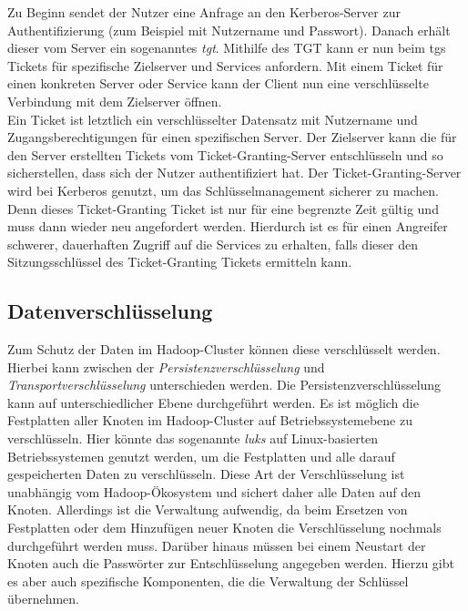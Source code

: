 \noindent
Zu Beginn sendet der Nutzer eine Anfrage an den Kerberos-Server zur Authentifizierung (zum Beispiel mit Nutzername und Passwort). Danach erhält dieser vom Server ein sogenanntes \textit{\gls{tgt}}. Mithilfe des TGT kann er nun beim \gls{tgs} Tickets für spezifische Zielserver und Services anfordern. Mit einem Ticket für einen konkreten Server oder Service kann der Client nun eine verschlüsselte Verbindung mit dem Zielserver öffnen.\\
Ein Ticket ist letztlich ein verschlüsselter Datensatz mit Nutzername und Zugangsberechtigungen für einen spezifischen Server. Der Zielserver kann die für den Server erstellten Tickets vom Ticket-Granting-Server entschlüsseln und so sicherstellen, dass sich der Nutzer authentifiziert hat. Der Ticket-Granting-Server wird bei Kerberos genutzt, um das Schlüsselmanagement sicherer zu machen. Denn dieses Ticket-Granting Ticket ist nur für eine begrenzte Zeit gültig und muss dann wieder neu angefordert werden. Hierdurch ist es für einen Angreifer schwerer, dauerhaften Zugriff auf die Services zu erhalten, falls dieser den Sitzungsschlüssel des Ticket-Granting Tickets ermitteln kann.\cite[S. 425-429]{crypto}\\


\subsection{Datenverschlüsselung}
Zum Schutz der Daten im Hadoop-Cluster können diese verschlüsselt werden. Hierbei kann zwischen der \textit{Persistenzverschlüsselung} und \textit{Transportverschlüsselung} unterschieden werden. Die Persistenzverschlüsselung kann auf unterschiedlicher Ebene durchgeführt werden. Es ist möglich die Festplatten aller Knoten im Hadoop-Cluster auf Betriebssystemebene zu verschlüsseln. Hier könnte das sogenannte \textit{\gls{luks}} auf Linux-basierten Betriebssystemen genutzt werden, um die Festplatten und alle darauf gespeicherten Daten zu verschlüsseln. Diese Art der Verschlüsselung ist unabhängig vom Hadoop-Ökosystem und sichert daher alle Daten auf den Knoten. Allerdings ist die Verwaltung aufwendig, da beim Ersetzen von Festplatten oder dem Hinzufügen neuer Knoten die Verschlüsselung nochmals durchgeführt werden muss. Darüber hinaus müssen bei einem Neustart der Knoten auch die Passwörter zur Entschlüsselung angegeben werden. Hierzu gibt es aber auch spezifische Komponenten, die die Verwaltung der Schlüssel übernehmen. \cite[S. 202-204]{hadoop_security}\\

